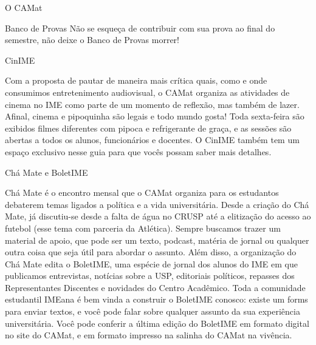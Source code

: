 \begin{secao}{O CAMat}
\begin{subsecao}{Banco de Provas}
Não se esqueça de contribuir com sua prova ao final do semestre, não
deixe o Banco de Provas morrer! 

\end{subsecao}




\begin{subsecao}{CinIME}

Com a proposta de pautar de maneira mais crítica quais, como e onde consumimos 
entretenimento audiovisual, o CAMat organiza as atividades de cinema no IME 
como parte de um momento de reflexão, mas também de lazer. Afinal, cinema e 
pipoquinha são legais e todo mundo gosta! Toda sexta-feira são exibidos filmes 
diferentes com pipoca e refrigerante de graça, e as sessões são abertas a todos 
os alunos, funcionários e docentes. O CinIME também tem um espaço exclusivo nesse
guia para que vocês possam saber mais detalhes.

\end{subsecao}

\begin{subsecao}{Chá Mate e BoletIME}

Chá Mate é o encontro mensal que o CAMat organiza para os estudantos debaterem temas
ligados a política e a vida universitária. Desde a criação do Chá Mate, já discutiu-se
desde a falta de água no CRUSP até a elitização do acesso ao futebol (esse tema com parceria
da Atlética). Sempre buscamos trazer um material de apoio, que pode ser um texto, podcast, matéria
de jornal ou qualquer outra coisa que seja útil para abordar o assunto. 
Além disso, a organização do Chá Mate edita o BoletIME, uma espécie de jornal dos alunos do IME em
que publicamos entrevistas, notícias sobre a USP, editoriais políticos, repasses dos Representantes
Discentes e novidades do Centro Acadêmico. Toda a comunidade estudantil IMEana é bem vinda a construir
o BoletIME conosco: existe um forms para enviar textos, e você pode falar sobre qualquer assunto da sua
experiência universitária. Você pode conferir a última edição do BoletIME em formato 
digital no site do CAMat, e em formato impresso na salinha do CAMat na vivência.


\end{subsecao}
\end{secao}
